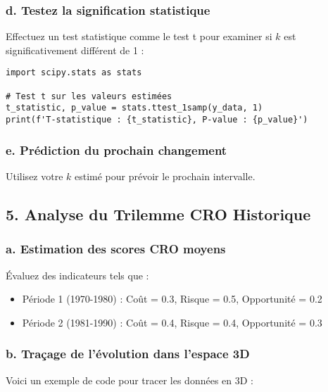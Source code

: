 \documentclass{article}
\begin{document}
\subsubsection{d. Testez la signification statistique}
Effectuez un test statistique comme le test t pour examiner si \( k \) est significativement différent de 1 :

\begin{verbatim}
import scipy.stats as stats

# Test t sur les valeurs estimées
t_statistic, p_value = stats.ttest_1samp(y_data, 1)
print(f'T-statistique : {t_statistic}, P-value : {p_value}')
\end{verbatim}

\subsubsection{e. Prédiction du prochain changement}
Utilisez votre \( k \) estimé pour prévoir le prochain intervalle.

\subsection{5. Analyse du Trilemme CRO Historique}

\subsubsection{a. Estimation des scores CRO moyens}
Évaluez des indicateurs tels que :

\begin{itemize}
    \item Période 1 (1970-1980) : Coût = 0.3, Risque = 0.5, Opportunité = 0.2
    \item Période 2 (1981-1990) : Coût = 0.4, Risque = 0.4, Opportunité = 0.3
\end{itemize}

\subsubsection{b. Traçage de l'évolution dans l'espace 3D}
Voici un exemple de code pour tracer les données en 3D :
\end{document}
